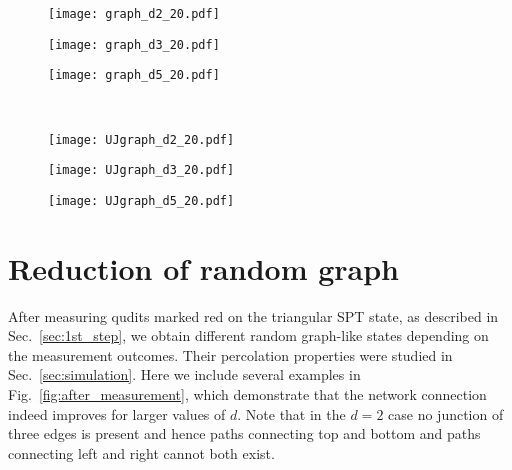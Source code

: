 \documentclass[aps,amsfonts,pra,twocolumn,showpacs]{revtex4-1}
\begin{document}
\begin{figure*}[!htb]
	\begin{subfigure}{0.3\textwidth}
		\centering
		\texttt{[image: graph\_d2\_20.pdf]}
		\caption{}
	\end{subfigure}
	\hspace{0.5mm}
	\begin{subfigure}{0.3\textwidth}
		\centering
		\texttt{[image: graph\_d3\_20.pdf]}
		\caption{}
	\end{subfigure}
	\hspace{0.5mm}
	\begin{subfigure}{0.3\textwidth}
		\centering
		\texttt{[image: graph\_d5\_20.pdf]}
		\caption{}
	\end{subfigure} \\
	\vspace{1mm}
	\begin{subfigure}{0.3\textwidth}
		\centering
		\texttt{[image: UJgraph\_d2\_20.pdf]}
		\caption{}
	\end{subfigure}
	\hspace{0.5mm}
	\begin{subfigure}{0.3\textwidth}
		\centering
		\texttt{[image: UJgraph\_d3\_20.pdf]}
		\caption{}
	\end{subfigure}
	\hspace{0.5mm}
	\begin{subfigure}{0.3\textwidth}
		\centering
		\texttt{[image: UJgraph\_d5\_20.pdf]}
		\caption{}
	\end{subfigure}
	\caption{Examples of connected structure for the random graph-like state generated after measurements. The top figures are embedded in honeycomb after measuring triangular SPT state, for $d=2, \, 3, \, 5$ respectively. The bottom figures are embedded in square after measuring Union-Jack state. \label{fig:after_measurement}}
	\end{figure*}

\section{Reduction of random graph} \label{app:convert_procedure}

After measuring qudits marked red on the triangular SPT state, as described in Sec.~\ref{sec:1st_step}, we obtain different random graph-like states depending on the measurement outcomes. Their percolation properties were studied in Sec.~\ref{sec:simulation}. Here we include several examples in Fig.~\ref{fig:after_measurement}, which demonstrate that the network connection indeed improves for larger values of $d$. Note that in the $d=2$ case no junction of three edges is present and hence paths connecting top and bottom and paths connecting left and right cannot both exist.
\end{document}
